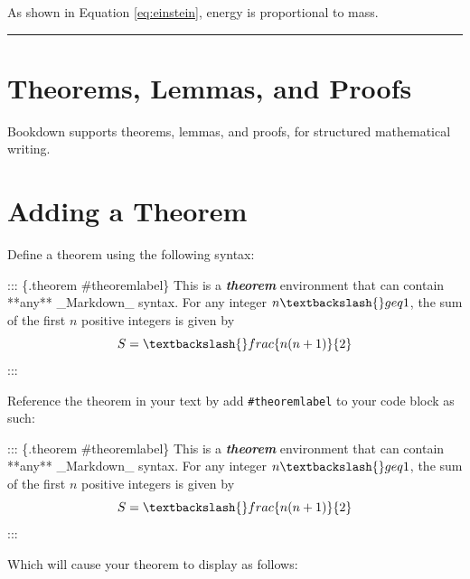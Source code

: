 \documentclass[
]{book}
\newenvironment{Shaded}{\begin{snugshade}}{\end{snugshade}}
\newcommand{\InformationTok}[1]{\textcolor[rgb]{0.56,0.35,0.01}{\textbf{\textit{#1}}}}
\newcommand{\NormalTok}[1]{#1}
\theoremstyle{definition}
\theoremstyle{definition}
\theoremstyle{definition}
\theoremstyle{definition}
\theoremstyle{remark}
\begin{document}
As shown in Equation \eqref{eq:einstein}, energy is proportional to mass.

\begin{center}\rule{0.5\linewidth}{0.5pt}\end{center}

\section{Theorems, Lemmas, and Proofs}\label{theorems-lemmas-and-proofs}

Bookdown supports theorems, lemmas, and proofs, for structured mathematical writing.

\section{Adding a Theorem}\label{adding-a-theorem}

Define a theorem using the following syntax:

\begin{Shaded}
\begin{Highlighting}[]
\NormalTok{::: \{.theorem \#theoremlabel\}}
\NormalTok{This is a }\InformationTok{\textasciigrave{}theorem\textasciigrave{}}\NormalTok{ environment that can contain **any**}
\NormalTok{\_Markdown\_ syntax.}
\NormalTok{For any integer $n \textbackslash{}geq 1$, the sum of the first $n$ positive integers is given by}
\NormalTok{$$}
\NormalTok{S = \textbackslash{}frac\{n(n + 1)\}\{2\}}
\NormalTok{$$}
\NormalTok{:::}
\end{Highlighting}
\end{Shaded}

Reference the theorem in your text by add \texttt{\#theoremlabel} to your code block as such:

\begin{Shaded}
\begin{Highlighting}[]
\NormalTok{::: \{.theorem \#theoremlabel\}}
\NormalTok{This is a }\InformationTok{\textasciigrave{}theorem\textasciigrave{}}\NormalTok{ environment that can contain **any**}
\NormalTok{\_Markdown\_ syntax.}
\NormalTok{For any integer $n \textbackslash{}geq 1$, the sum of the first $n$ positive integers is given by}
\NormalTok{$$}
\NormalTok{S = \textbackslash{}frac\{n(n + 1)\}\{2\}}
\NormalTok{$$}
\NormalTok{:::}
\end{Highlighting}
\end{Shaded}

Which will cause your theorem to display as follows:
\end{document}
